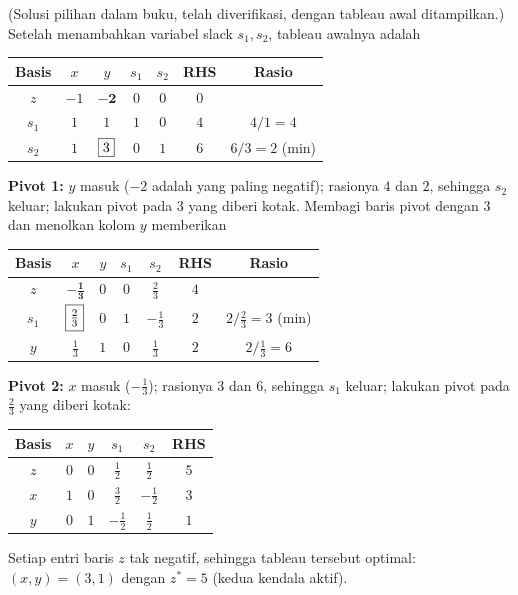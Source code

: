 
(Solusi pilihan dalam buku, telah diverifikasi, dengan tableau awal
ditampilkan.) Setelah menambahkan variabel slack $s_1, s_2$, tableau awalnya
adalah
\begin{center}
\renewcommand{\arraystretch}{1.3}
\begin{tabular}{c|cccc|c|c}
Basis & $x$ & $y$ & $s_1$ & $s_2$ & RHS & Rasio\\
\hline
$z$   & $-1$ & $\mathbf{-2}$ & $0$ & $0$ & $0$ & \\
\hline
$s_1$ & $1$ & $1$ & $1$ & $0$ & $4$ & $4/1 = 4$\\
$s_2$ & $1$ & $\fbox{3}$ & $0$ & $1$ & $6$ & $6/3 = 2$ (min)\\
\end{tabular}
\end{center}

\textbf{Pivot 1:} $y$ masuk ($-2$ adalah yang paling negatif); rasionya $4$
dan $2$, sehingga $s_2$ keluar; lakukan pivot pada $3$ yang diberi kotak.
Membagi baris pivot dengan $3$ dan menolkan kolom $y$ memberikan
\begin{center}
\renewcommand{\arraystretch}{1.3}
\begin{tabular}{c|cccc|c|c}
Basis & $x$ & $y$ & $s_1$ & $s_2$ & RHS & Rasio\\
\hline
$z$   & $\mathbf{-\tfrac13}$ & $0$ & $0$ & $\tfrac23$ & $4$ & \\
\hline
$s_1$ & $\fbox{$\tfrac23$}$ & $0$ & $1$ & $-\tfrac13$ & $2$ & $2/\tfrac23 = 3$ (min) \\
$y$   & $\tfrac13$ & $1$ & $0$ & $\tfrac13$  & $2$ & $2/\tfrac13 = 6$\\
\end{tabular}
\end{center}

\textbf{Pivot 2:} $x$ masuk ($-\tfrac13$); rasionya $3$ dan $6$, sehingga
$s_1$ keluar; lakukan pivot pada $\tfrac23$ yang diberi kotak:
\begin{center}
\renewcommand{\arraystretch}{1.3}
\begin{tabular}{c|cccc|c}
Basis & $x$ & $y$ & $s_1$ & $s_2$ & RHS\\
\hline
$z$   & $0$ & $0$ & $\tfrac12$ & $\tfrac12$ & $5$\\
\hline
$x$ & $1$ & $0$ & $\tfrac32$  & $-\tfrac12$ & $3$\\
$y$ & $0$ & $1$ & $-\tfrac12$ & $\tfrac12$  & $1$\\
\end{tabular}
\end{center}
Setiap entri baris $z$ tak negatif, sehingga tableau tersebut optimal:
$(x, y) = (3, 1)$ dengan $z^* = 5$ (kedua kendala aktif).

